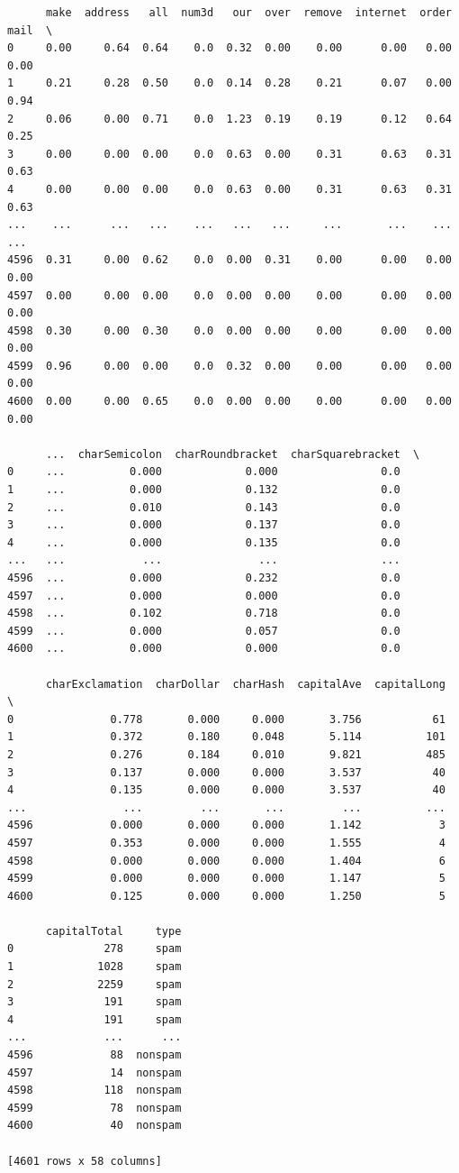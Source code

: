 \documentclass[
  letterpaper,
  DIV=11,
  numbers=noendperiod]{scrreprt}
\begin{document}
\begin{verbatim}
      make  address   all  num3d   our  over  remove  internet  order  mail  \
0     0.00     0.64  0.64    0.0  0.32  0.00    0.00      0.00   0.00  0.00   
1     0.21     0.28  0.50    0.0  0.14  0.28    0.21      0.07   0.00  0.94   
2     0.06     0.00  0.71    0.0  1.23  0.19    0.19      0.12   0.64  0.25   
3     0.00     0.00  0.00    0.0  0.63  0.00    0.31      0.63   0.31  0.63   
4     0.00     0.00  0.00    0.0  0.63  0.00    0.31      0.63   0.31  0.63   
...    ...      ...   ...    ...   ...   ...     ...       ...    ...   ...   
4596  0.31     0.00  0.62    0.0  0.00  0.31    0.00      0.00   0.00  0.00   
4597  0.00     0.00  0.00    0.0  0.00  0.00    0.00      0.00   0.00  0.00   
4598  0.30     0.00  0.30    0.0  0.00  0.00    0.00      0.00   0.00  0.00   
4599  0.96     0.00  0.00    0.0  0.32  0.00    0.00      0.00   0.00  0.00   
4600  0.00     0.00  0.65    0.0  0.00  0.00    0.00      0.00   0.00  0.00   

      ...  charSemicolon  charRoundbracket  charSquarebracket  \
0     ...          0.000             0.000                0.0   
1     ...          0.000             0.132                0.0   
2     ...          0.010             0.143                0.0   
3     ...          0.000             0.137                0.0   
4     ...          0.000             0.135                0.0   
...   ...            ...               ...                ...   
4596  ...          0.000             0.232                0.0   
4597  ...          0.000             0.000                0.0   
4598  ...          0.102             0.718                0.0   
4599  ...          0.000             0.057                0.0   
4600  ...          0.000             0.000                0.0   

      charExclamation  charDollar  charHash  capitalAve  capitalLong  \
0               0.778       0.000     0.000       3.756           61   
1               0.372       0.180     0.048       5.114          101   
2               0.276       0.184     0.010       9.821          485   
3               0.137       0.000     0.000       3.537           40   
4               0.135       0.000     0.000       3.537           40   
...               ...         ...       ...         ...          ...   
4596            0.000       0.000     0.000       1.142            3   
4597            0.353       0.000     0.000       1.555            4   
4598            0.000       0.000     0.000       1.404            6   
4599            0.000       0.000     0.000       1.147            5   
4600            0.125       0.000     0.000       1.250            5   

      capitalTotal     type  
0              278     spam  
1             1028     spam  
2             2259     spam  
3              191     spam  
4              191     spam  
...            ...      ...  
4596            88  nonspam  
4597            14  nonspam  
4598           118  nonspam  
4599            78  nonspam  
4600            40  nonspam  

[4601 rows x 58 columns]
\end{verbatim}
\end{document}
